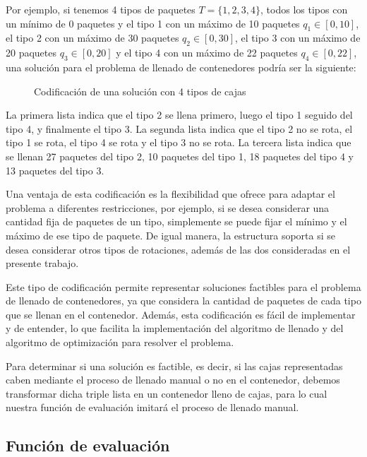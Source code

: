 \documentclass[openany]{article}
\begin{document}
Por ejemplo, si tenemos 4 tipos de paquetes $T=\{1,2,3,4\}$, todos los tipos con un mínimo de 0 paquetes y el tipo 1 con un máximo de 10 paquetes $q_1 \in [0,10]$, el tipo 2 con un máximo de 30 paquetes $q_2 \in [0,30]$, el tipo 3 con un máximo de 20 paquetes $q_3 \in [0,20]$ y el tipo 4 con un máximo de 22 paquetes $q_4 \in [0,22]$, una solución para el problema de llenado de contenedores podría ser la siguiente:

\begin{figure}[H]
    \centering
    
    \caption{Codificación de una solución con 4 tipos de cajas}
    \label{fig:codificación}
\end{figure}

La primera lista indica que el tipo 2 se llena primero, luego el tipo 1 seguido del tipo 4, y finalmente el tipo 3. La segunda lista indica que el tipo 2 no se rota, el tipo 1 se rota, el tipo 4 se rota y el tipo 3 no se rota. La tercera lista indica que se llenan 27 paquetes del tipo 2, 10 paquetes del tipo 1, 18 paquetes del tipo 4 y 13 paquetes del tipo 3.

Una ventaja de esta codificación es la flexibilidad que ofrece para adaptar el problema a diferentes restricciones, por ejemplo, si se desea considerar una cantidad fija de paquetes de un tipo, simplemente se puede fijar el mínimo y el máximo de ese tipo de paquete. De igual manera, la estructura soporta si se desea considerar otros tipos de rotaciones, además de las dos consideradas en el presente trabajo.

Este tipo de codificación permite representar soluciones factibles para el problema de llenado de contenedores, ya que considera la cantidad de paquetes de cada tipo que se llenan en el contenedor. Además, esta codificación es fácil de implementar y de entender, lo que facilita la implementación del algoritmo de llenado y del algoritmo de optimización para resolver el problema.

Para determinar si una solución es factible, es decir, si las cajas representadas caben mediante el proceso de llenado manual o no en el contenedor, debemos transformar dicha triple lista en un contenedor lleno de cajas, para lo cual nuestra función de evaluación imitará el proceso de llenado manual.

\subsection{Función de evaluación}
\end{document}
